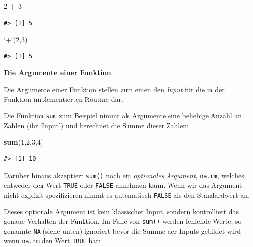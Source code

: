 \documentclass[]{book}
\newenvironment{Shaded}{\begin{snugshade}}{\end{snugshade}}
\newcommand{\KeywordTok}[1]{\textcolor[rgb]{0.13,0.29,0.53}{\textbf{#1}}}
\newcommand{\DataTypeTok}[1]{\textcolor[rgb]{0.13,0.29,0.53}{#1}}
\newcommand{\DecValTok}[1]{\textcolor[rgb]{0.00,0.00,0.81}{#1}}
\newcommand{\StringTok}[1]{\textcolor[rgb]{0.31,0.60,0.02}{#1}}
\newcommand{\OperatorTok}[1]{\textcolor[rgb]{0.81,0.36,0.00}{\textbf{#1}}}
\newcommand{\NormalTok}[1]{#1}
\begin{document}
\begin{Shaded}
\begin{Highlighting}[]
\DecValTok{2} \OperatorTok{+}\StringTok{ }\DecValTok{3}
\end{Highlighting}
\end{Shaded}

\begin{verbatim}
#> [1] 5
\end{verbatim}

\begin{Shaded}
\begin{Highlighting}[]
\StringTok{`}\DataTypeTok{+}\StringTok{`}\NormalTok{(}\DecValTok{2}\NormalTok{,}\DecValTok{3}\NormalTok{)}
\end{Highlighting}
\end{Shaded}

\begin{verbatim}
#> [1] 5
\end{verbatim}

\textbf{Die Argumente einer Funktion}

Die Argumente einer Funktion stellen zum einen den \emph{Input} für die
in der Funktion implementierten Routine dar.

Die Funktion \texttt{sum} zum Beispiel nimmt als Argumente eine
beliebige Anzahl an Zahlen (ihr `Input') und berechnet die Summe dieser
Zahlen:

\begin{Shaded}
\begin{Highlighting}[]
\KeywordTok{sum}\NormalTok{(}\DecValTok{1}\NormalTok{,}\DecValTok{2}\NormalTok{,}\DecValTok{3}\NormalTok{,}\DecValTok{4}\NormalTok{)}
\end{Highlighting}
\end{Shaded}

\begin{verbatim}
#> [1] 10
\end{verbatim}

Darüber hinaus akzeptiert \texttt{sum()} noch ein \emph{optionales
Argument}, \texttt{na.rm}, welches entweder den Wert \texttt{TRUE} oder
\texttt{FALSE} annehmen kann. Wenn wir das Argument nicht explizit
spezifizieren nimmt es automatisch \texttt{FALSE} als den Standardwert
an.

Dieses optionale Argument ist kein klassischer Input, sondern
kontrolliert das genaue Verhalten der Funktion. Im Falle von
\texttt{sum()} werden fehlende Werte, so genannte \texttt{NA} (siehe
unten) ignoriert bevor die Summe der Inputs gebildet wird wenn
\texttt{na.rm} den Wert \texttt{TRUE} hat:
\end{document}
